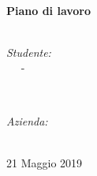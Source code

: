 \begin{titlepage}
    \HRule \\[0.4cm]
    { \huge \bfseries Piano di lavoro}\\[0.4cm] %
    \HRule \\[1.5cm]
    
    
    \vspace{1.5cm}
    
    \begin{minipage}{0.4\textwidth}
        \begin{flushleft} \large
            \emph{Studente:}\\
            \nomeStudente\ \textsc{\cognomeStudente\ } - \matricolaStudente
        \end{flushleft}
    \end{minipage}
    ~
    \begin{minipage}{0.4\textwidth}
        \begin{flushright} \large
            \emph{Azienda:} \\
            \ragioneSocAzienda
        \end{flushright}
    \end{minipage}\\[2cm]
    
    
    {\large 21 Maggio 2019}\\[2cm]
    
    
    \vfill 
    
\end{titlepage}